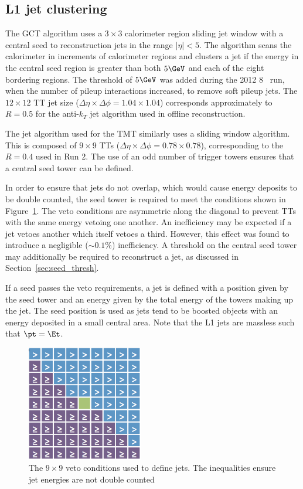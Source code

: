 \subsection{L1 jet clustering}
\label{sec:jet_algo}
The GCT algorithm uses a $3\times3$ calorimeter region sliding jet window with a central seed 
to reconstruction jets in the range $|\eta| < 5$. The algorithm scans the calorimeter in increments
of calorimeter regions and clusters a jet if the energy in the central seed region is greater than 
both $5 \GeV$ and each of the eight bordering regions. The threshold of $5 \GeV$ was added during 
the 2012 8 \TeV~run, when the number of pileup interactions increased, to remove soft pileup jets.
The $12\times12$ TT jet size ($\Delta\eta\times\Delta\phi = 1.04\times1.04$) corresponds 
approximately to $R=0.5$ for the anti-$k_T$ jet algorithm used in offline reconstruction.

The jet algorithm used for the TMT similarly uses a sliding window algorithm. This
is composed of $9\times9$ TTs ($\Delta\eta\times\Delta\phi = 0.78\times0.78$), corresponding 
to the $R=0.4$ used in Run 2. The use of an odd number of trigger towers ensures that a central 
seed tower can be defined. 

In order to ensure that jets do not overlap, which would cause energy deposits 
to be double counted, the seed tower is required to meet the conditions
shown in Figure~\ref{mask}. The veto conditions are asymmetric along the diagonal to prevent  
TTs with the same energy vetoing one another. An inefficiency may be expected 
if a jet vetoes another which itself vetoes a third. However, this effect was found to 
introduce a negligible ($\sim0.1\%$) inefficiency. A threshold on the central seed tower may 
additionally be required to reconstruct a jet, as discussed in Section~\ref{sec:seed_thresh}. 

If a seed passes the veto requirements, a jet is defined with a position 
given by the seed tower and an energy given by the total energy of the towers
making up the jet. The seed position is used as jets tend to be boosted
 objects with an energy deposited in a small central area. 
Note that the L1 jets are massless such that $\pt = \Et$.

\begin{figure}
\centering
    \includegraphics[width=0.45\textwidth]{./Figures/triggerUpgrade/mask.png}
  \caption{The $9\times9$ veto conditions used to define jets. The inequalities ensure
  jet energies are not double counted}
  \label{mask}
\end{figure}

